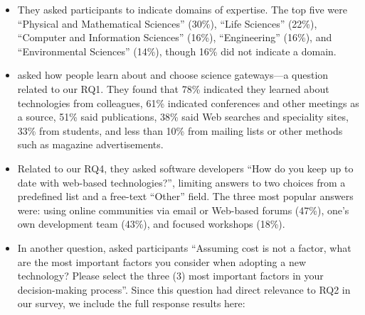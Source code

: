 \documentclass[review]{elsarticle}
\begin{document}
\begin{itemize}

\item They asked participants to indicate domains of expertise.  The top five were ``Physical and Mathematical Sciences'' (30\%), ``Life Sciences'' (22\%), ``Computer and Information Sciences'' (16\%), ``Engineering'' (16\%), and ``Environmental Sciences'' (14\%), though 16\% did not indicate a domain.

\item \citeauthor{lawrence2015science} asked how people learn about and choose science gateways---a question related to our RQ1.  They found that 78\% indicated they learned about technologies from colleagues, 61\% indicated conferences and other meetings as a source, 51\% said publications, 38\% said Web searches and speciality sites, 33\% from students, and less than 10\% from mailing lists or other methods such as magazine advertisements.


\item Related to our RQ4, they asked software developers ``How do you keep up to date with web-based technologies?'', limiting answers to two choices from a predefined list and a free-text ``Other'' field.  The three most popular answers were: using online communities via email or Web-based forums (47\%), one's own development team (43\%), and focused workshops (18\%).

\item In another question, \citet{lawrence2015science} asked participants ``Assuming cost is not a factor, what are the most important factors you consider when adopting a new technology? Please select the three (3) most important factors in your decision-making process''.  Since this question had direct relevance to RQ2 in our survey, we include the full response results here:


\end{itemize}
\end{document}
